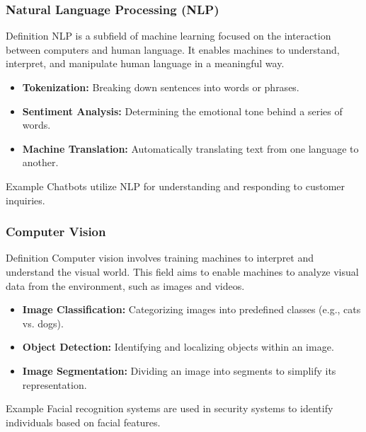 \documentclass[aspectratio=169]{beamer}
\begin{document}
\begin{frame}[fragile]
    \frametitle{Natural Language Processing (NLP)}
    \begin{block}{Definition}
        NLP is a subfield of machine learning focused on the interaction between computers and human language. 
        It enables machines to understand, interpret, and manipulate human language in a meaningful way.
    \end{block}

    \begin{itemize}
        \item \textbf{Tokenization:} Breaking down sentences into words or phrases.
        \item \textbf{Sentiment Analysis:} Determining the emotional tone behind a series of words.
        \item \textbf{Machine Translation:} Automatically translating text from one language to another.
    \end{itemize}

    \begin{block}{Example}
        Chatbots utilize NLP for understanding and responding to customer inquiries.
    \end{block}
\end{frame}

\begin{frame}[fragile]
    \frametitle{Computer Vision}
    \begin{block}{Definition}
        Computer vision involves training machines to interpret and understand the visual world. 
        This field aims to enable machines to analyze visual data from the environment, such as images and videos.
    \end{block}

    \begin{itemize}
        \item \textbf{Image Classification:} Categorizing images into predefined classes (e.g., cats vs. dogs).
        \item \textbf{Object Detection:} Identifying and localizing objects within an image.
        \item \textbf{Image Segmentation:} Dividing an image into segments to simplify its representation.
    \end{itemize}

    \begin{block}{Example}
        Facial recognition systems are used in security systems to identify individuals based on facial features.
    \end{block}
\end{frame}
\end{document}
